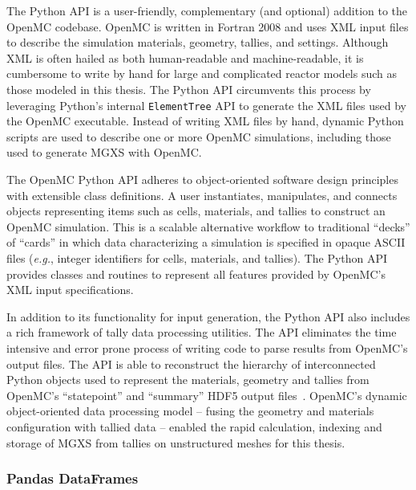 
The Python \ac{API} is a user-friendly, complementary (and optional) addition to the OpenMC codebase. OpenMC is written in Fortran 2008 and uses \ac{XML} input files to describe the simulation materials, geometry, tallies, and settings. Although \ac{XML} is often hailed as both human-readable and machine-readable, it is cumbersome to write by hand for large and complicated reactor models such as those modeled in this thesis. The Python \ac{API} circumvents this process by leveraging Python's internal \texttt{ElementTree} \ac{API} to generate the \ac{XML} files used by the OpenMC executable. Instead of writing \ac{XML} files by hand, dynamic Python scripts are used to describe one or more OpenMC simulations, including those used to generate \ac{MGXS} with OpenMC.

The OpenMC Python \ac{API} adheres to object-oriented software design principles with extensible class definitions. A user instantiates, manipulates, and connects objects representing items such as cells, materials, and tallies to construct an OpenMC simulation. This is a scalable alternative workflow to traditional ``decks'' of ``cards'' in which data characterizing a simulation is specified in opaque \ac{ASCII} files (\textit{e.g.}, integer identifiers for cells, materials, and tallies). The Python \ac{API} provides classes and routines to represent all features provided by OpenMC's \ac{XML} input specifications.

In addition to its functionality for input generation, the Python \ac{API} also includes a rich framework of tally data processing utilities. The \ac{API} eliminates the time intensive and error prone process of writing code to parse results from OpenMC's output files. The \ac{API} is able to reconstruct the hierarchy of interconnected Python objects used to represent the materials, geometry and tallies from OpenMC's ``statepoint'' and ``summary'' \ac{HDF5} output files~\cite{koranne2011hdf5}. OpenMC's dynamic object-oriented data processing model -- fusing the geometry and materials configuration with tallied data -- enabled the rapid calculation, indexing and storage of \ac{MGXS} from tallies on unstructured meshes for this thesis.
  
\subsubsection{Pandas DataFrames}
\label{subsubsec:chap4-pandas-df}

